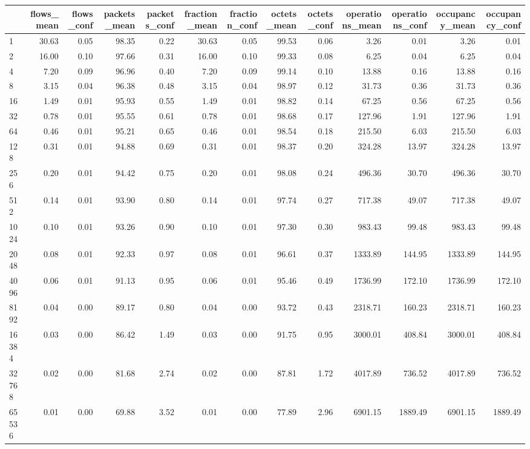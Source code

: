 \begin{tabular}{lrrrrrrrrrrrr}
\toprule
 & flows_mean & flows_conf & packets_mean & packets_conf & fraction_mean & fraction_conf & octets_mean & octets_conf & operations_mean & operations_conf & occupancy_mean & occupancy_conf \\
\midrule
1 & 30.63 & 0.05 & 98.35 & 0.22 & 30.63 & 0.05 & 99.53 & 0.06 & 3.26 & 0.01 & 3.26 & 0.01 \\
2 & 16.00 & 0.10 & 97.66 & 0.31 & 16.00 & 0.10 & 99.33 & 0.08 & 6.25 & 0.04 & 6.25 & 0.04 \\
4 & 7.20 & 0.09 & 96.96 & 0.40 & 7.20 & 0.09 & 99.14 & 0.10 & 13.88 & 0.16 & 13.88 & 0.16 \\
8 & 3.15 & 0.04 & 96.38 & 0.48 & 3.15 & 0.04 & 98.97 & 0.12 & 31.73 & 0.36 & 31.73 & 0.36 \\
16 & 1.49 & 0.01 & 95.93 & 0.55 & 1.49 & 0.01 & 98.82 & 0.14 & 67.25 & 0.56 & 67.25 & 0.56 \\
32 & 0.78 & 0.01 & 95.55 & 0.61 & 0.78 & 0.01 & 98.68 & 0.17 & 127.96 & 1.91 & 127.96 & 1.91 \\
64 & 0.46 & 0.01 & 95.21 & 0.65 & 0.46 & 0.01 & 98.54 & 0.18 & 215.50 & 6.03 & 215.50 & 6.03 \\
128 & 0.31 & 0.01 & 94.88 & 0.69 & 0.31 & 0.01 & 98.37 & 0.20 & 324.28 & 13.97 & 324.28 & 13.97 \\
256 & 0.20 & 0.01 & 94.42 & 0.75 & 0.20 & 0.01 & 98.08 & 0.24 & 496.36 & 30.70 & 496.36 & 30.70 \\
512 & 0.14 & 0.01 & 93.90 & 0.80 & 0.14 & 0.01 & 97.74 & 0.27 & 717.38 & 49.07 & 717.38 & 49.07 \\
1024 & 0.10 & 0.01 & 93.26 & 0.90 & 0.10 & 0.01 & 97.30 & 0.30 & 983.43 & 99.48 & 983.43 & 99.48 \\
2048 & 0.08 & 0.01 & 92.33 & 0.97 & 0.08 & 0.01 & 96.61 & 0.37 & 1333.89 & 144.95 & 1333.89 & 144.95 \\
4096 & 0.06 & 0.01 & 91.13 & 0.95 & 0.06 & 0.01 & 95.46 & 0.49 & 1736.99 & 172.10 & 1736.99 & 172.10 \\
8192 & 0.04 & 0.00 & 89.17 & 0.80 & 0.04 & 0.00 & 93.72 & 0.43 & 2318.71 & 160.23 & 2318.71 & 160.23 \\
16384 & 0.03 & 0.00 & 86.42 & 1.49 & 0.03 & 0.00 & 91.75 & 0.95 & 3000.01 & 408.84 & 3000.01 & 408.84 \\
32768 & 0.02 & 0.00 & 81.68 & 2.74 & 0.02 & 0.00 & 87.81 & 1.72 & 4017.89 & 736.52 & 4017.89 & 736.52 \\
65536 & 0.01 & 0.00 & 69.88 & 3.52 & 0.01 & 0.00 & 77.89 & 2.96 & 6901.15 & 1889.49 & 6901.15 & 1889.49 \\

\end{tabular}
